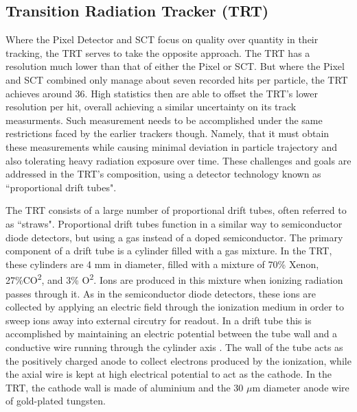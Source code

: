     \subsection{Transition Radiation Tracker (TRT)}
            Where the Pixel Detector and SCT focus on quality over quantity in their tracking, the TRT serves to take the opposite approach.
            The TRT has a resolution much lower than that of either the Pixel or SCT.
            But where the Pixel and SCT combined only manage about seven recorded hits per particle, the TRT achieves around 36.
            High statistics then are able to offset the TRT's lower resolution per hit, overall achieving a similar uncertainty on its track measurments.
            Such measurement needs to be accomplished under the same restrictions faced by the earlier trackers though.
            Namely, that it must obtain these measurements while causing minimal deviation in particle trajectory and also tolerating heavy radiation exposure over time.
            These challenges and goals are addressed in the TRT's composition, using a detector technology known as ``proportional drift tubes".

            The TRT consists of a large number of proportional drift tubes, often referred to as ``straws".
            Proportional drift tubes function in a similar way to semiconductor diode detectors, but using a gas instead of a doped semiconductor.
            The primary component of a drift tube is a cylinder filled with a gas mixture.
            In the TRT, these cylinders are 4 mm in diameter, filled with a mixture of 70\% Xenon, 27\%CO\textsuperscript{2}, and 3\% O\textsuperscript{2}.
            Ions are produced in this mixture when ionizing radiation passes through it.
            As in the semiconductor diode detectors, these ions are collected by applying an electric field through the ionization medium in order to sweep ions away into external circutry for readout.
            In a drift tube this is accomplished by maintaining an electric potential between the tube wall and a conductive wire running through the cylinder axis \cite{drift_chambers}.
            The wall of the tube acts as the positively charged anode to collect electrons produced by the ionization, while the axial wire is kept at high electrical potential to act as the cathode.
            In the TRT, the cathode wall is made of aluminium and the 30 $\mu$m diameter anode wire of gold-plated tungsten. \cite{trt_design}

